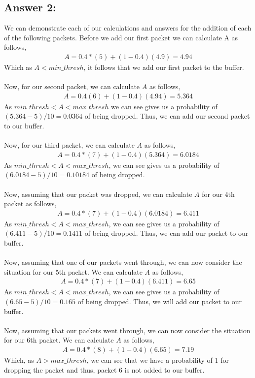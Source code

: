 \documentclass[10pt]{article}
\begin{document}
\subsection*{Answer 2: }
We can demonstrate each of our calculations and answers for the addition of each of the following packets. Before we add our first packet we can calculate A as follows,
\begin{align*}
    A = 0.4*(5) + (1-0.4)(4.9) = 4.94
\end{align*}
Which as $A < min\_thresh$, it follows that we add our first packet to the buffer.\\\\
Now, for our second packet, we can calculate $A$ as follows,
\begin{align*}
    A = 0.4(6) + (1-0.4)(4.94) = 5.364
\end{align*}
As $min\_thresh < A < max\_thresh$ we can see gives us a probability of $ (5.364- 5)/10 = 0.0364$ of being dropped. Thus, we can add our second packet to our buffer.\\\\
Now, for our third packet, we can calculate $A$ as follows,
\begin{align*}
    A = 0.4*(7) + (1-0.4)(5.364) = 6.0184
\end{align*}
As $min\_thresh < A < max\_thresh$, we can see gives us a probability of $(6.0184 - 5)/10 = 0.10184$ of being dropped.\\\\
Now, assuming that our packet was dropped, we can calculate $A$ for our 4th packet as follows,
\begin{align*}
    A = 0.4*(7) + (1-0.4)(6.0184) = 6.411
\end{align*}
As $min\_thresh < A < max\_thresh$, we can see gives us a probability of $(6.411 - 5)/10 = 0.1411$ of being dropped. Thus, we can add our packet to our buffer.\\\\
Now, assuming that one of our packets went through, we can now consider the situation for our 5th packet. We can calculate $A$ as follows,
\begin{align*}
    A = 0.4*(7) + (1-0.4)(6.411) = 6.65
\end{align*}
As $min\_thresh < A < max\_thresh$, we can see gives us a probability of $(6.65 - 5)/10 = 0.165$ of being dropped. Thus, we will add our packet to our buffer.\\\\
Now, assuming that our packets went through, we can now consider the situation for our 6th packet. We can calculate $A$ as follows,
\begin{align*}
    A = 0.4*(8) + (1-0.4)(6.65) = 7.19
\end{align*}
Which, as $A > max\_thresh$, we can see that we have a probability of 1 for dropping the packet and thus, packet 6 is not added to our buffer.
\end{document}
